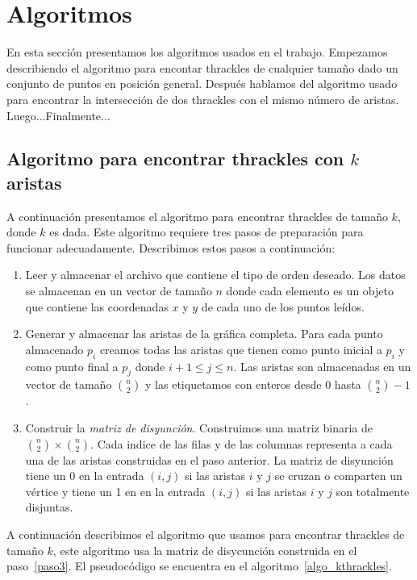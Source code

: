 \section{Algoritmos}\label{seccion_algoritmos}
En esta sección presentamos los algoritmos usados en el trabajo. Empezamos
describiendo el algoritmo para encontar thrackles de cualquier tamaño dado
un conjunto de puntos en posición general. Después hablamos del algoritmo
usado para encontrar la intersección de dos thrackles con el mismo número de
aristas. Luego...Finalmente...


\subsection{Algoritmo para encontrar thrackles con $k$
  aristas}\label{seccion_algoritmo_kthrackles}
  A continuación presentamos el algoritmo para encontrar thrackles de tamaño
  $k$, donde $k$ es dada. Este algoritmo requiere tres pasos de preparación para funcionar adecuadamente. Describimos estos pasos a continuación:
  \begin{enumerate}
    \item Leer y almacenar el archivo que contiene el tipo de orden deseado.
    Los datos se almacenan en un vector de tamaño $n$ donde cada elemento es
    un objeto que contiene las coordenadas $x$ y $y$ de cada uno de los puntos
    leídos.
    \item Generar y almacenar las aristas de la gráfica completa.
    Para cada punto almacenado $p_i$ creamos todas las aristas que tienen como punto inicial a $p_i$ y como punto final a $p_j$ donde $ i+1 \leq j \leq n$.
    Las aristas son almacenadas en un vector de tamaño $\binom{n}{2}$ y las etiquetamos con enteros desde $0$ hasta $\binom{n}{2}-1$.
    \item \label{paso3}Construir la \emph{matriz de disyunción}.
    Construimos una matriz binaria de $\binom{n}{2}\times \binom{n}{2}$. Cada
    indice de las filas y de las columnas representa a cada una de las aristas construidas en el paso anterior. La matriz de disyunción tiene un 0 en la entrada $(i,j)$ si las aristas $i$ y $j$ se cruzan o comparten un vértice y tiene un 1 en en la entrada $(i,j)$ si las aristas $i$ y $j$ son totalmente disjuntas.
  \end{enumerate}

  A continuación describimos el algoritmo que usamos para encontrar thrackles
  de tamaño $k$, este algoritmo usa la matriz de disycunción construida en el
  paso~\ref{paso3}. El pseudocódigo se encuentra en el
  algoritmo~\ref{algo_kthrackles}.

